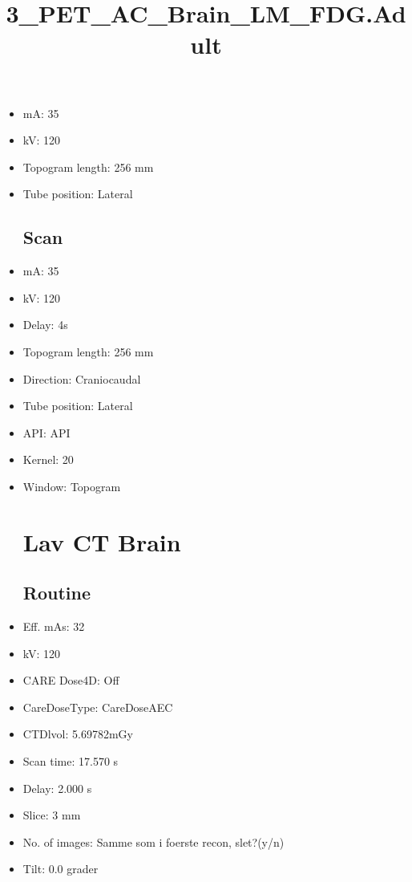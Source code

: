 \documentclass[12pt]{article}
\title{3\_PET\_AC\_Brain\_LM\_FDG.Adult}
\begin{document}
\maketitle
\newpage
\tableofcontents
\newpage
{}


\begin{itemize}\section{Topogram}
\subsection{Routine}
\item mA: 35\item kV: 120\item Topogram length: 256 mm\item Tube position: Lateral
\subsection{Scan}\item mA: 35\item kV: 120\item Delay: 4s\item Topogram length: 256 mm\item Direction: Craniocaudal\item Tube position: Lateral\item API: API \item Kernel: 20\item Window: Topogram
\section{Lav CT Brain}
\subsection{Routine}
\item Eff. mAs: 32\item kV: 120\item CARE Dose4D: Off\item CareDoseType: CareDoseAEC\item CTDlvol: 5.69782mGy\item Scan time: 17.570 s\item Delay: 2.000 s\item Slice: 3 mm\item No. of images: Samme som i foerste recon, slet?(y/n)\item Tilt: 0.0 grader

\end{itemize}
\end{document}
